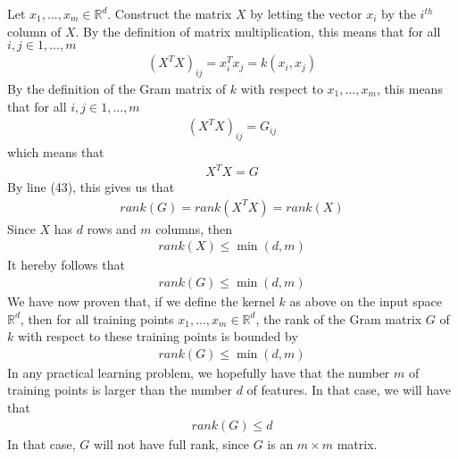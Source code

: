 Let $x_1,...,x_m \in \mathbb{R}^d$. Construct the matrix $X$ by letting the vector $x_i$ by the $i^{th}$ column of $X$. By the definition of matrix multiplication, this means that for all $i, j \in{1,...,m}$
\begin{align}
(X^TX)_{ij} = x_i^Tx_j = k(x_i,x_j)
\end{align}
By the definition of the Gram matrix of $k$ with respect to $x_1,...,x_m$, this means that for all $i, j \in{1,...,m}$
\begin{align}
(X^TX)_{ij} = G_{ij}
\end{align}
which means that
\begin{align}
X^TX=G 
\end{align}
By line (43), this gives us that
\begin{align}
rank(G)=rank(X^TX)=rank(X)
\end{align}
Since $X$ has $d$ rows and $m$ columns, then
\begin{align}
rank(X) \leq \min(d,m)
\end{align}
It hereby follows that
\begin{align}
rank(G) \leq \min(d,m)
\end{align}
We have now proven that, if we define the kernel $k$ as above on the input space $\mathbb{R}^d$, then for all training points $x_1, ..., x_m \in \mathbb{R}^d$, the rank of the Gram matrix $G$ of $k$ with respect to these training points is bounded by
\begin{align}
rank(G) \leq \min(d,m)
\end{align}
In any practical learning problem, we hopefully have that the number $m$ of training points is larger than the number $d$ of features. In that case, we will have that
\begin{align}
rank(G) \leq d 
\end{align}
In that case, $G$ will not have full rank, since $G$ is an $m\times m$ matrix.